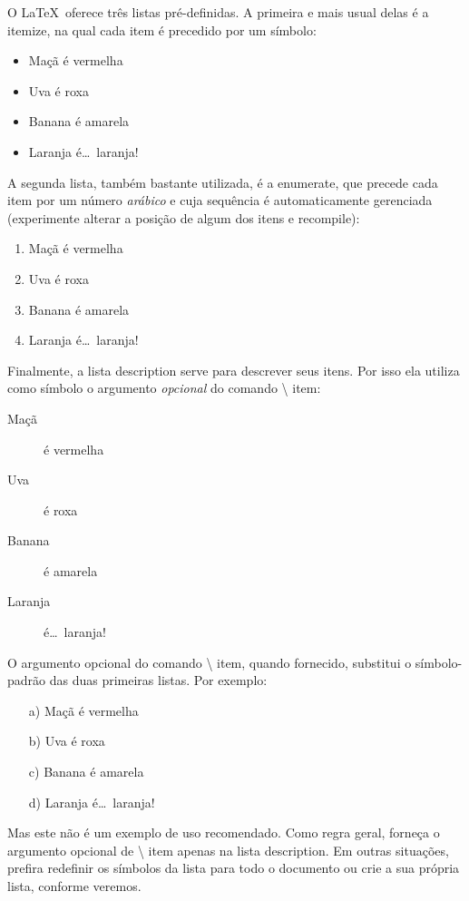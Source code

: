 \documentclass[a4paper,12pt]{article}
\newcommand{\ambiente}[1]{{\normalfont\color{orange!70!black} #1}}
\newcommand{\comando}[1]{{\normalfont\sffamily\textbackslash\color{blue!30!black} #1}}
\begin{document}
	O \LaTeX\ oferece três listas pré-definidas. A primeira e mais usual delas é a \ambiente{itemize}, na qual cada item é precedido por um símbolo:

	\begin{itemize}	
		\item Maçã é vermelha		
		\item Uva é roxa
		\item Banana é amarela
		\item Laranja é\dots\ laranja!
	\end{itemize}

	A segunda lista, também bastante utilizada, é a \ambiente{enumerate}, que precede	cada item por um número \emph{arábico} e cuja sequência é automaticamente	gerenciada (experimente alterar a posição de algum dos itens e recompile):

	\begin{enumerate}
		\item Maçã é vermelha
		\item Uva é roxa
		\item Banana é amarela
		\item Laranja é\dots\ laranja!
	\end{enumerate}

	Finalmente, a lista \ambiente{description} serve para descrever seus itens. Por isso ela utiliza como símbolo o argumento \emph{opcional} do comando \comando{item}:

	\begin{description}
		\item [Maçã] é vermelha
		\item [Uva] é roxa
		\item [Banana] é amarela
		\item [Laranja] é\dots\ laranja!
	\end{description}

	O argumento opcional do comando \comando{item}, quando fornecido, substitui o	símbolo-padrão das duas primeiras listas. Por exemplo:

	\begin{enumerate}
		\item[a)] Maçã é vermelha
		\item[b)] Uva é roxa
		\item[c)] Banana é amarela
		\item[d)] Laranja é\dots\ laranja!
	\end{enumerate}

	Mas este não é um exemplo de uso recomendado. Como regra geral, forneça o	argumento opcional de \comando{item} apenas na lista \ambiente{description}. Em outras situações, prefira redefinir os símbolos da lista para todo o documento ou crie a sua própria lista, conforme veremos.
\end{document}
